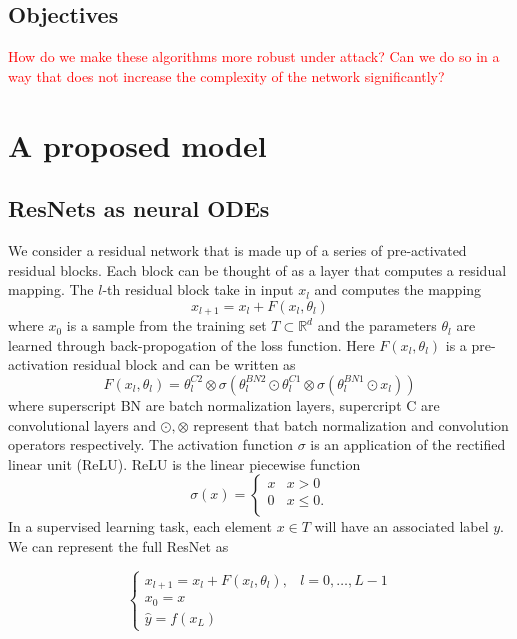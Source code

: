 \documentclass[12pt]{article}
\begin{document}
\subsection{Objectives}
\textcolor{red}{How do we make these algorithms more robust under attack? Can we do so in a way that does not increase the complexity of the network significantly?}
\section{A proposed model}
\subsection{ResNets as neural ODEs}
We consider a residual network that is made up of a series of pre-activated residual blocks. Each block can be thought of as a layer that computes a residual mapping. The $l$-th residual block take in input $x_l$ and computes the mapping
$$ x_{l+1} = x_{l} + F(x_l,\theta_l)$$
where $x_0$ is a sample from the training set $T \subset \mathbb{R}^d $ and the parameters $\theta_l$ are learned through back-propogation of the loss function. Here $F(x_l,\theta_l)$ is a pre-activation residual block and can be written as
$$ F(x_l,\theta_l) =  \theta_l^{C2}\otimes\sigma(\theta_l^{BN2}\odot\theta_l^{C1}\otimes\sigma(\theta_l^{BN1}\odot x_l))$$
where superscript BN are batch normalization layers, supercript C are convolutional layers and $\odot, \otimes$ represent that batch normalization and convolution operators respectively. The activation function $\sigma$ is an application of the rectified linear unit (ReLU). ReLU is the linear piecewise function
\begin{equation*}
\sigma(x) = \begin{cases} x & x > 0 \\
 0 & x \leq 0. \\
\end{cases}
\end{equation*}
In a supervised learning task, each element $x \in T$ will have an associated label $y$. We can represent the full ResNet as

\begin{equation} \begin{cases}
x_{l+1} = x_l + F(x_l,\theta_l), & l=0,\dots,L-1 \\
x_0 = x \\
\hat y = f(x_L)
\end{cases} \end{equation}
\end{document}
